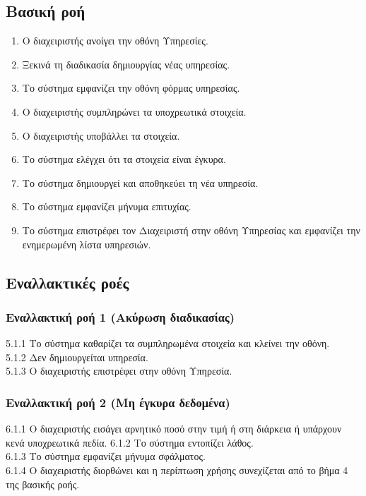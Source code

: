 \documentclass[12pt,a4paper,twoside]{book}
\begin{document}
\subsection{Βασική ροή}
\begin{enumerate}
  \item Ο διαχειριστής ανοίγει την οθόνη Υπηρεσίες. 
  \item Ξεκινά τη διαδικασία δημιουργίας νέας υπηρεσίας. 
  \item Το σύστημα εμφανίζει την οθόνη φόρμας υπηρεσίας. 
  \item Ο διαχειριστής συμπληρώνει τα υποχρεωτικά στοιχεία. 
  \item Ο διαχειριστής υποβάλλει τα στοιχεία. 
  \item Το σύστημα ελέγχει ότι τα στοιχεία είναι έγκυρα. 
  \item Το σύστημα δημιουργεί και αποθηκεύει τη νέα υπηρεσία. 
  \item Το σύστημα εμφανίζει μήνυμα επιτυχίας. 
  \item Το σύστημα επιστρέφει τον Διαχειριστή στην οθόνη Υπηρεσίας και εμφανίζει την ενημερωμένη λίστα υπηρεσιών. 
\end{enumerate}

\subsection{Εναλλακτικές ροές}

\subsubsection*{Εναλλακτική ροή 1 (Ακύρωση διαδικασίας)}
5.1.1 Το σύστημα καθαρίζει τα συμπληρωμένα στοιχεία και κλείνει την οθόνη. \\
\hspace*{\parindent}5.1.2 Δεν δημιουργείται υπηρεσία.\\
\hspace*{\parindent}5.1.3 Ο διαχειριστής επιστρέφει στην οθόνη Υπηρεσία.

\subsubsection*{Εναλλακτική ροή 2 (Μη έγκυρα δεδομένα)}
6.1.1 Ο διαχειριστής εισάγει αρνητικό ποσό στην τιμή ή στη διάρκεια ή υπάρχουν κενά υποχρεωτικά πεδία. 
\hspace*{\parindent}6.1.2 Το σύστημα εντοπίζει λάθος.\\
\hspace*{\parindent}6.1.3 Το σύστημα εμφανίζει μήνυμα σφάλματος.\\
\hspace*{\parindent}6.1.4 Ο διαχειριστής διορθώνει και η περίπτωση χρήσης συνεχίζεται από το βήμα 4 της βασικής ροής.
\end{document}
